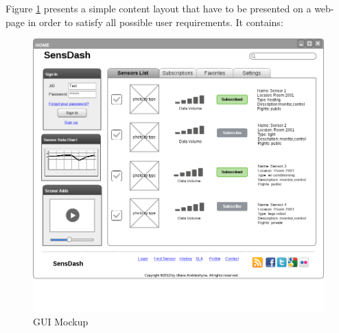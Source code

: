   Figure \ref{img:GUI Mockup} presents a simple content layout that have to be presented on a web-page in order to satisfy all possible user requirements. It contains:

    \begin{figure}[!ht]
    \centering
    \includegraphics[scale=0.5]{images/Mockup.png}   
    \caption[GUI Mockup]{GUI Mockup}
    \label{img:GUI Mockup}                           
    \end{figure}

